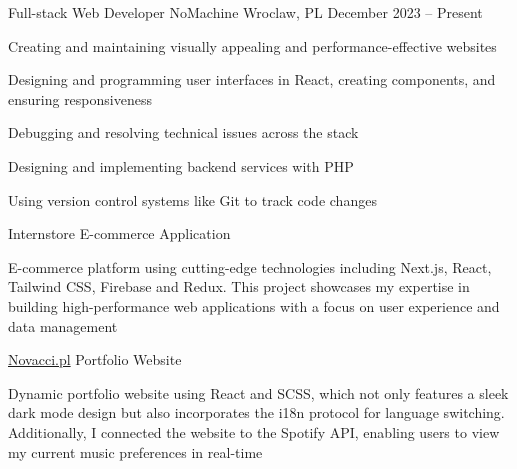 \documentclass[]{awesome-cv}
\begin{document}
\vspace{-5mm}
\begin{cventries}
  \cventry
  {Full-stack Web Developer}
  {NoMachine}
  {Wroclaw, PL}
  {December 2023 – Present}
  {\begin{cvitems}
    \item {Creating and maintaining visually appealing and performance-effective websites}
    \item {Designing and programming user interfaces in React, creating components, and ensuring responsiveness}
    \item {Debugging and resolving technical issues across the stack}
    \item {Designing and implementing backend services with PHP}
    \item {Using version control systems like Git to track code changes}
	\vspace{1.5mm} 
    \end{cvitems}}
	\vspace{2mm} 
	\cventry
  {Internstore}
  {E-commerce Application}
  {}
  {}
  {\begin{cvitems}
    \item {E-commerce platform using cutting-edge technologies including Next.js, React, Tailwind CSS, Firebase and Redux. This project showcases my expertise in building high-performance web applications with a focus on user experience and data management}
    \end{cvitems}}
	\cventry
{\href{https://novacci.pl/}{Novacci.pl}}
  {Portfolio Website}
  {}
  {}
  {\begin{cvitems}
    \item {Dynamic portfolio website using React and SCSS, which not only features a sleek dark mode design but also incorporates the i18n protocol for language switching. Additionally, I connected the website to the Spotify API, enabling users to view my current music preferences in real-time}
    \end{cvitems}}
\end{cventries}
\vspace{-2mm}
\end{document}
